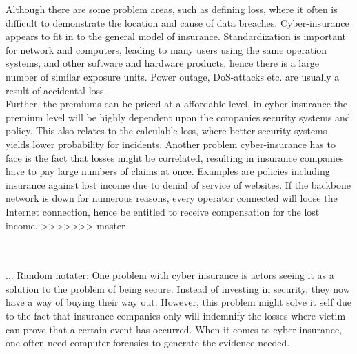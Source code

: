     
 Although there are some problem areas, such as defining loss, where it often is difficult to demonstrate the location and cause of data breaches. Cyber-insurance appears to fit in to the general model of insurance. Standardization is important for network and computers, leading to many users using the same operation systems, and other software and hardware products, hence there is a large number of similar exposure units. Power outage, DoS-attacks etc. are usually a result of accidental loss.
 \\ Further, the premiums can be priced at a affordable level, in cyber-insurance the premium level will be highly dependent upon the companies security systems and policy. This also relates to the calculable loss, where better security systems yields lower probability for incidents. \cite{robinson2012incentives}
 Another problem cyber-insurance has to face is the fact that losses might be correlated, resulting in insurance companies have to pay large numbers of claims at once. Examples are policies including insurance against lost income due to denial of service of websites. If the backbone network is down for numerous reasons, every operator connected will loose the Internet connection, hence be entitled to receive compensation for the lost income.   
>>>>>>> master
 
   
 



\\
\\
... Random notater: One problem with cyber insurance is actors seeing it as a solution to the problem of being secure. Instead of investing in security, they now have a way of buying their way out. However, this problem might solve it self due to the fact that insurance companies only will indemnify the losses where victim can prove that a certain event has occurred. When it comes to cyber insurance, one often need computer forensics to generate the evidence needed. 








